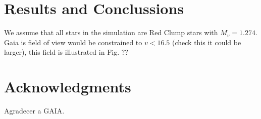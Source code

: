 \documentclass[useAMS,usenatbib]{mn2e}
\begin{document}
\section{Results and Conclussions}

We assume that all stars in the simulation are Red Clump
stars with $M_v=1.274$. Gaia is field of view would be constrained 
to $v<16.5$ (check this it could be larger), this field is illustrated in Fig. ??





\section*{Acknowledgments}
 
 
 
 Agradecer a GAIA. 
\end{document}
